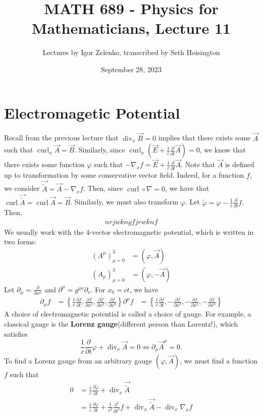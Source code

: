 \documentclass{article}
\title{MATH 689 - Physics for Mathematicians, Lecture 11}
\author{Lectures by Igor Zelenko, transcribed by Seth Hoisington}
\date{September 28, 2023}
\newcommand{\nl}{\newline\newline\noindent}
\newcommand{\vhi}{\varphi}
\newcommand{\pd}[1]{\frac{\partial}{\partial #1}}
\newcommand{\pdof}[2]{\frac{\partial #1}{\partial #2}}
\DeclareMathOperator{\Div}{div}
\DeclareMathOperator{\curl}{curl}
\begin{document}
\maketitle

\section{Electromagetic Potential}
Recall from the previous lecture that $\Div_x\vec B = 0$ implies that there exists some $\vec A$ such that $\curl_x\vec A = \vec B$. Similarly, since $\curl_x(\vec E + \frac{1}{c}\pd{t}\vec A) = 0$, we know that there exists some function $\vhi$ such that $-\nabla_x f= \vec E + \frac{1}{c}\pd{t}\vec A$.
\nl
Note that $\vec A$ is defined up to transformation by some conservative vector field. Indeed, for a function $f$, we consider $\vec{\tilde A} = \vec A - \nabla_x f$. Then, since $\curl\circ\nabla  = 0$, we have that $\curl\vec{\tilde A} = \curl{\vec A} = \vec B$. Similarly, we must also transform $\vhi$. Let $\tilde \vhi = \vhi - \frac{1}{c}\pd{t}f$. Then,
\begin{align*}
    nrjwkngfjrwknf
\end{align*}
We usually work with the 4-vector electromagnetic potential, which is written in two forms:
\begin{align*}
    (A^\mu)_{\mu = 0}^3 &= (\vhi, \vec A) \\ (A_\mu)_{\mu = 0}^3 &= (\vhi, -\vec A)
\end{align*}
Let $\partial_\mu = \pd{x^\mu}$ and $\partial^\mu = g^{\mu\nu}\partial_\nu$. For $x_0 = ct$, we have
\begin{align*}
    \partial_\mu f &= \left\{\frac{1}{c}\pdof{f}{t},\pdof{f}{x^1},\pdof{f}{x^2},\pdof{f}{x^3}\right\}
    \partial^\mu f &= \left\{\frac{1}{c}\pdof{f}{t},-\pdof{f}{x^1},-\pdof{f}{x^2},-\pdof{f}{x^3}\right\}
\end{align*}
A choice of electromagnetic potential is called a choice of gauge. For example, a classical gauge is the  \textbf{Lorenz gauge}(different person than Lorentz!), which satisfies
\[\frac{1}{c}\pd{t}\vhi + \Div_x\vec{A} = 0 \Leftrightarrow \partial_\mu\vec A^\mu = 0.\]
To find a Lorenz gauge from an arbitrary gauge $(\vhi,\vec A)$, we must find a function $f$ such that
\begin{align*}
    0 &= \frac{1}{c}\pdof{\tilde\vhi}{t} + \Div_x\vec {\tilde A}\\
    &=\frac{1}{c}\pdof{\vhi}{t} + \frac{1}{c^2}\frac{\partial^2}{\partial t^2}f + \Div_x\vec {\tilde A} - \Div_x\nabla_x f\\
\end{align*}
\end{document}
